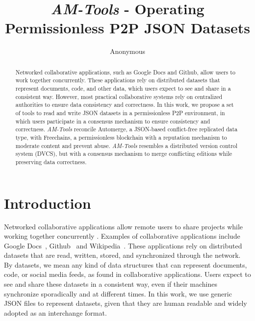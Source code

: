 \documentclass[12pt]{article}
\title{
    \emph{AM-Tools} - Operating Permissionless P2P JSON Datasets
}
\author{Anonymous}
\begin{document}
\begin{comment}
- 8 paginas
- Descrição e motivação do problema resolvido pela ferramenta;
- Arquitetura da solução e descrição das principais funcionalidades;
- Descrição da demonstração planejada para o Salão de Ferramentas, informando equipamentos necessários para tal;
- URL onde a ferramenta está disponível (obrigatório na modalidade Código Aberto);
- URL dos manuais e documentação da ferramenta, incluindo informações e requisitos para instalação (obrigatório na modalidade Código Aberto);
- URL com um vídeo explicando a instalação e as funcionalidades da ferramenta (obrigatório na modalidade Código Fechado e opcional na modalidade Código Aberto).
\end{comment}

\maketitle

\begin{abstract}
Networked collaborative applications, such as Google Docs and Github, allow
users to work together concurrently.
These applications rely on distributed datasets that represent documents, code,
and other data, which users expect to see and share in a consistent way.
However, most practical collaborative systems rely on centralized authorities
to ensure data consistency and correctness.
%
In this work, we propose a set of tools to read and write JSON datasets in a
permissionless P2P environment, in which users participate in a consensus
mechanism to ensure consistency and correctness.
%
\emph{AM-Tools} reconcile Automerge, a JSON-based conflict-free replicated data
type, with Freechains, a permissionless blockchain with a reputation mechanism
to moderate content and prevent abuse.
%
\emph{AM-Tools} resembles a distributed version control system (DVCS), but with
a consensus mechanism to merge conflicting editions while preserving data
correctness.
\end{abstract}

\section{Introduction}
\label{sec.introduction}

Networked collaborative applications allow remote users to share projects while
working together concurrently \cite{wu2010partial}.
Examples of collaborative applications include Google
Docs~\cite{attebury2008google}, Github~\cite{preston2008github} and
Wikipedia~\cite{wikipedia2004wikipedia}.
%
These applications rely on distributed datasets that are read, written, stored,
and synchronized through the network.
By datasets, we mean any kind of data structures that can represent documents,
code, or social media feeds, as found in collaborative applications.
Users expect to see and share these datasets in a consistent way, even if their
machines synchronize sporadically and at different times.
%
In this work, we use generic JSON files to represent datasets, given that they
are human readable and widely adopted as an interchange format.
\end{document}
